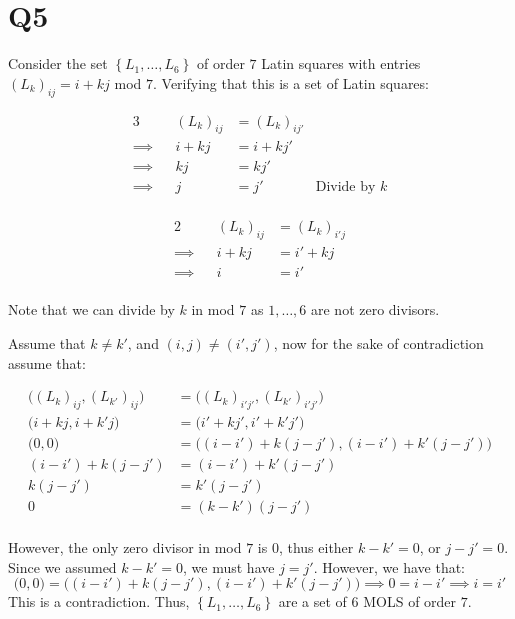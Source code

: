 \documentclass[a4paper, 11pt]{article}
\def\set#1{\left\{ #1 \right\}}
\begin{document}
\pagebreak
\section*{Q5}
Consider the set $\set{L_1,\dots,L_6}$ of order $7$ Latin squares with entries $(L_k)_{ij}= i+kj$ mod $7$. Verifying that this is a set of Latin squares: 

\begin{mdframed}
	\begin{minipage}{0.5\textwidth}
		\begin{alignat*}{3}
			&& (L_k)_{ij} &= (L_k)_{ij'}	\\
	\implies&&i+kj        &= i+kj'          \\
	\implies&&kj          &= kj'            \\
	\implies&& j          &= j' &\text{Divide by $k$}            \\
	\end{alignat*}
	\end{minipage}
	\begin{minipage}{0.5\textwidth}
		\begin{alignat*}{2}
			&& (L_k)_{ij} &= (L_k)_{i'j}	\\
		\implies&&i+kj    &= i'+kj          \\
		\implies&&i       &= i'            \\
		\end{alignat*}
	\end{minipage}
	
	Note that we can divide by $k$ in mod $7$ as $1,\dots,6$ are not zero divisors.
\end{mdframed}

Assume that $k\neq k'$, and $(i,j)\neq (i',j')$, now for the sake of contradiction assume that: 

\begin{align*}
	\Big((L_k)_{ij}, (L_{k'})_{ij}\Big) &= \Big((L_k)_{i'j'}, (L_{k'})_{i'j'}\Big)\\
	\Big(i+kj, i+k'j\Big) &= \Big(i'+kj', i'+k'j'\Big)\\
	        \Big(0,0\Big) &= \Big((i-i')+k(j-j'), (i-i')+k'(j-j')\Big) \\
	     (i-i') + k(j-j') &=(i-i') + k'(j-j') \\
	              k(j-j') &= k'(j-j') \\
	                    0 &=(k-k')(j-j') \\
\end{align*}

However, the only zero divisor in mod $7$ is $0$, thus either $k-k'=0$, or $j-j'=0$. Since we assumed $k-k'=0$, we must have $j=j'$. However, we have that: 
\[
	\Big(0,0\Big) = \Big((i-i')+k(j-j'), (i-i')+k'(j-j')\Big) \implies 0 =i-i'\implies i=i'
\]
This is a contradiction. Thus, $\set{L_1,\dots,L_6}$ are a set of $6$ MOLS of order $7$. 
\end{document}
